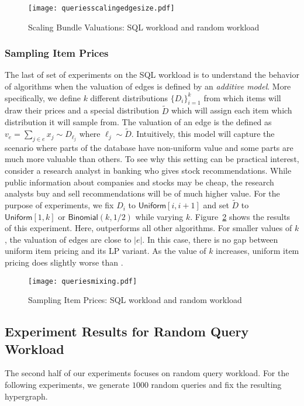 \begin{figure}[!t]
	\centering
	\texttt{[image: queriesscalingedgesize.pdf]}
	\caption{Scaling Bundle Valuations: SQL workload and random workload} \label{fig:scalingedge}
\end{figure}  

\subsubsection{Sampling Item Prices} The last of set of experiments on the SQL workload is to understand the behavior of algorithms when the valuation of edges is defined by an \emph{additive model}. More specifically, we define $k$ different distributions $\{D_i\}_{i=1}^{k}$ from which items will draw their prices and a special distribution $\tilde{D}$ which will assign each item which distribution it will sample from. The valuation of an edge is the defined as $v_e = \sum_{j \in e} x_j \sim D_{\ell_j}$ where $\ell_j \sim \tilde{D}$. Intuitively, this model will capture the scenario where parts of the database have non-uniform value and some parts are much more valuable than others. To see why this setting can be practical interest, consider a research analyst in banking who gives stock recommendations. While public information about companies and stocks may be cheap, the research analysts buy and sell recommendations will be of much higher value. For the purpose of experiments, we fix $D_i$ to $\textsf{Uniform}[i, i+1]$ and set $\tilde{D}$ to $\textsf{Uniform}[1, k]$ or $\textsf{Binomial}(k, 1/2)$ while varying $k$. Figure~\ref{fig:mixing} shows the results of this experiment. Here, \lpip outperforms all other algorithms. For smaller values of $k$, the valuation of edges are close to $|e|$. In this case, there is no gap between uniform item pricing and its LP variant. As  the value of $k$ increases, uniform item pricing does slightly worse than \lpip.


\begin{figure}[!t]
	\centering
	\texttt{[image: queriesmixing.pdf]}
	\caption{Sampling Item Prices: SQL workload and random workload} \label{fig:mixing}
\end{figure}  

\subsection{Experiment Results for Random Query Workload}


The second half of our experiments focuses on random query workload. For the following experiments, we generate $1000$ random queries and fix the resulting hypergraph. 

